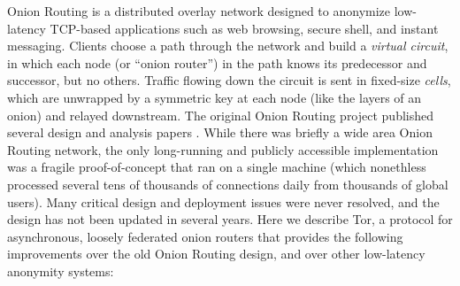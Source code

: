 \documentclass[times,10pt,twocolumn]{article}
\begin{document}
Onion Routing is a distributed overlay network designed to anonymize
low-latency TCP-based applications such as web browsing, secure shell,
and instant messaging. Clients choose a path through the network and
build a \emph{virtual circuit}, in which each node (or ``onion router'') 
in the path knows its
predecessor and successor, but no others. Traffic flowing down the circuit
is sent in fixed-size \emph{cells}, which are unwrapped by a symmetric key
at each node (like the layers of an onion) and relayed downstream. The
original Onion Routing project published several design and analysis
papers
\cite{or-jsac98,or-discex00,or-ih96,or-pet00}. While there was briefly
a wide area Onion Routing network,
the only long-running and publicly accessible
implementation was a fragile proof-of-concept that ran on a single
machine (which nonethless processed several tens of thousands of connections
daily from thousands of global users).
Many critical design and deployment issues were never resolved,
and the design has not been updated in several years.
Here we describe Tor, a protocol for asynchronous, loosely
federated onion routers that provides the following improvements over
the old Onion Routing design, and over other low-latency anonymity systems:
\end{document}
